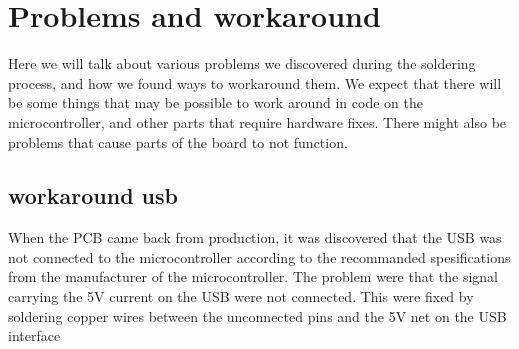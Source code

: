 \section {Problems and workaround}

Here we will talk about various problems we discovered during the soldering process, and how we found ways to workaround them.
We expect that there will be some things that may be possible to work around in code on the microcontroller, and other parts that require hardware fixes.
There might also be problems that cause parts of the board to not function.

\subsection{workaround usb}
When the PCB came back from production, it was discovered that the USB was not connected to the microcontroller
according to the recommanded spesifications from the manufacturer of the microcontroller. The problem were that the
signal carrying the 5V current on the USB were not connected. This were fixed by soldering copper wires between the unconnected pins and the 5V net on the USB interface
